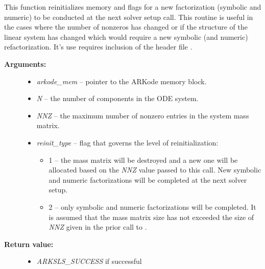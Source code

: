 \documentclass[letterpaper,10pt,english]{sphinxmanual}
\begin{document}
\begin{fulllineitems}
\label{c_interface/User_callable:c.ARKMassKLUReInit}
This function reinitializes memory and flags for a new
factorization (symbolic and numeric) to be conducted at the next
solver setup call.  This routine is useful in the cases where the
number of nonzeros has changed or if the structure of the linear
system has changed which would require a new symbolic (and
numeric) refactorization.  It's use requires inclusion of the
header file .
\begin{description}
\item[{\textbf{Arguments:}}] \leavevmode\begin{itemize}
\item {} 
\emph{arkode\_mem} -- pointer to the ARKode memory block.

\item {} 
\emph{N} -- the number of components in the ODE system.

\item {} 
\emph{NNZ} -- the maximum number of nonzero entries in the system
mass matrix.

\item {} 
\emph{reinit\_type} -- flag that governs the level of
reinitialization:
\begin{itemize}
\item {} 
1 -- the mass matrix will be destroyed and a new one
will be allocated based on the \emph{NNZ} value passed to this
call.  New symbolic and numeric factorizations will be
completed at the next solver setup.

\item {} 
2 -- only symbolic and numeric factorizations will be
completed.  It is assumed that the mass matrix size has not
exceeded the size of \emph{NNZ} given in the prior call to
{\hyperref[c_interface/User_callable:c.ARKMassKLU]{\emph{}}}.

\end{itemize}

\end{itemize}

\item[{\textbf{Return value:}}] \leavevmode\begin{itemize}
\item {} 
\emph{ARKSLS\_SUCCESS}   if successful


\end{itemize}
\end{description}
\end{fulllineitems}
\end{document}
